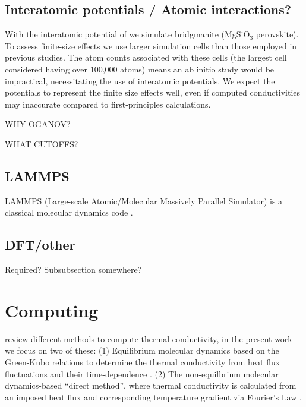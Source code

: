 \subsection{Interatomic potentials / Atomic interactions?}
With the interatomic potential of \citet{Oganov2000} we simulate bridgmanite (MgSiO$_3$ perovskite). To assess finite-size effects we use larger simulation cells than those employed in previous studies. The atom counts associated with these cells (the largest cell considered having over 100,000 atoms) means an ab initio study would be impractical, necessitating the use of interatomic potentials. We expect the potentials to represent the finite size effects well, even if computed conductivities may inaccurate compared to first-principles calculations.

WHY OGANOV? 

WHAT CUTOFFS?

\subsection{LAMMPS}
LAMMPS (Large-scale Atomic/Molecular Massively Parallel Simulator) is a classical molecular dynamics code \citep{Plimpton1995}.

\subsection{DFT/other}
Required? Subsubsection somewhere?



\section{Computing \tc}
\citet{Stackhouse2010} review different methods to compute thermal conductivity, in the present work we focus on two of these:
(1) Equilibrium molecular dynamics based on the Green-Kubo relations to determine the thermal conductivity from heat flux fluctuations and their time-dependence \citep{Green1954,Kubo1957,Kubo1966,Schelling2002}. 
(2) The non-equilbrium molecular dynamics-based ``direct method'', where thermal conductivity is calculated from an imposed heat flux and corresponding temperature gradient via Fourier's Law \citep{Muller-Plathe1997,Nieto-Draghi2013}.

